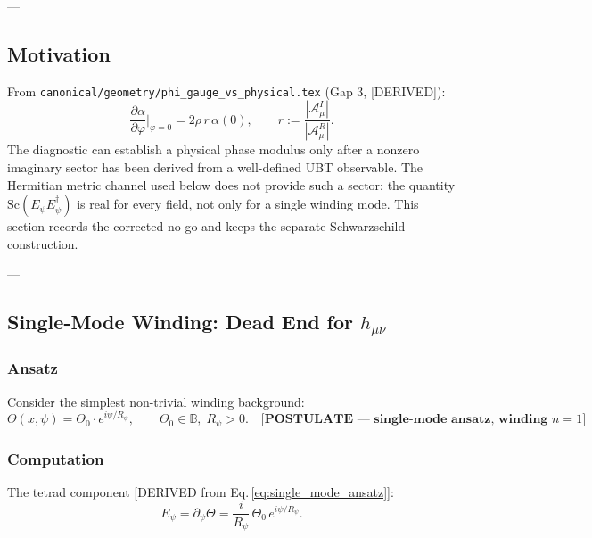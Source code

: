 ---

\subsection{Motivation}
\label{sec:biq_vacuum_motivation}

From \texttt{canonical/geometry/phi\_gauge\_vs\_physical.tex} (Gap 3, [DERIVED]):
\begin{equation}
  \frac{\partial\alpha}{\partial\varphi}\bigg|_{\varphi=0} = 2\rho\, r\,\alpha(0),
  \qquad r := \frac{|\mathcal{A}^I_\mu|}{|\mathcal{A}^R_\mu|}.
  \label{eq:dalpha_dphi_recap}
\end{equation}
The diagnostic can establish a physical phase modulus only after a nonzero
imaginary sector has been derived from a well-defined UBT observable.  The
Hermitian metric channel used below does not provide such a sector: the
quantity $\mathrm{Sc}(E_\psi E_\psi^\dagger)$ is real for every field, not
only for a single winding mode.  This section records the corrected no-go and
keeps the separate Schwarzschild construction.

---

\subsection{Single-Mode Winding: Dead End for $h_{\mu\nu}$}
\label{sec:single_mode_dead_end}

\subsubsection{Ansatz}

Consider the simplest non-trivial winding background:
\begin{equation}
  \Theta(x,\psi) = \Theta_0 \cdot e^{i\psi/R_\psi},
  \qquad \Theta_0 \in \mathbb{B},\; R_\psi > 0.
  \label{eq:single_mode_ansatz}
  \quad \textbf{[POSTULATE — single-mode ansatz, winding $n=1$]}
\end{equation}

\subsubsection{Computation}

The tetrad component [DERIVED from Eq.\,\eqref{eq:single_mode_ansatz}]:
\begin{equation}
  E_\psi = \partial_\psi\Theta = \frac{i}{R_\psi}\,\Theta_0\,e^{i\psi/R_\psi}.
\end{equation}

